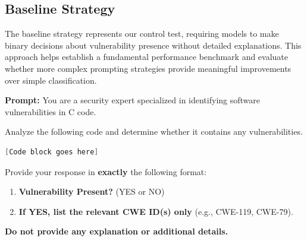 \documentclass[sigconf]{acmart}
\begin{document}
\subsection{Baseline Strategy}
The baseline strategy represents our control test, requiring models to make binary decisions about vulnerability presence without detailed explanations. This approach helps establish a fundamental performance benchmark and evaluate whether more complex prompting strategies provide meaningful improvements over simple classification.
\begin{tcolorbox}[colback=bluebox, colframe=blue!60!black, 
title=\textbf{Baseline Strategy (YES/NO + CWE Only)}, 
sharp corners=south, boxrule=1pt, width=\linewidth]
\textbf{Prompt:}  
You are a security expert specialized in identifying software vulnerabilities in C code.

Analyze the following code and determine whether it contains any vulnerabilities.

\begin{lstlisting}[language=C, 
                  backgroundcolor=\color{codebg},
                  basicstyle=\footnotesize\ttfamily,
                  breaklines=true,
                  frame=none]
[Code block goes here]
\end{lstlisting}

Provide your response in \textbf{exactly} the following format:
\begin{enumerate}
    \item \textbf{Vulnerability Present?} (YES or NO)
    \item \textbf{If YES, list the relevant CWE ID(s) only} (e.g., CWE-119, CWE-79).
\end{enumerate}

\textbf{Do not provide any explanation or additional details.}
\end{tcolorbox}


\end{document}
